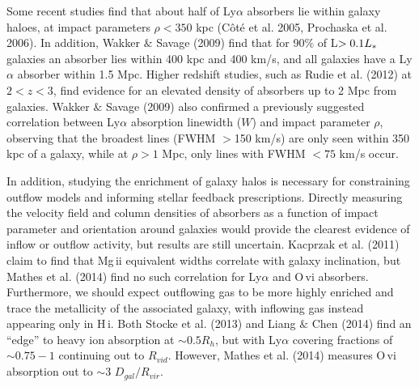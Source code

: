 \documentclass[iop]{emulateapj-rtx4}
\begin{document}


Some recent studies find that about half of Ly$\alpha$ absorbers lie within galaxy haloes, at impact parameters $\rho<350$ kpc (C\^{o}t\'{e} et al. 2005, Prochaska et al. 2006). In addition, Wakker $\&$ Savage (2009) find that for 90$\%$ of L$>0.1L_{\**}$ galaxies an absorber lies within 400 kpc and 400 km/s, and all galaxies have a Ly$\alpha$ absorber within 1.5 Mpc. Higher redshift studies, such as Rudie et al. (2012) at $2<z<3$, find evidence for an elevated density of absorbers up to 2 Mpc from galaxies. Wakker $\&$ Savage (2009) also confirmed a previously suggested correlation between Ly$\alpha$ absorption linewidth ($W$) and impact parameter $\rho$, observing that the broadest lines (FWHM $>$150 km/s) are only seen within 350 kpc of a galaxy, while at $\rho>1$ Mpc, only lines with FWHM $<75$ km/s occur.


In addition, studying the enrichment of galaxy halos is necessary for constraining outflow models and informing stellar feedback prescriptions. Directly measuring the velocity field and column densities of absorbers as a function of impact parameter and orientation around galaxies would provide the clearest evidence of inflow or outflow activity, but results are still uncertain. Kacprzak et al. (2011) claim to find that Mg\,{\sc ii} equivalent widths correlate with galaxy inclination, but Mathes et al. (2014) find no such correlation for Ly$\alpha$ and O\,{\sc vi} absorbers. Furthermore, we should expect outflowing gas to be more highly enriched and trace the metallicity of the associated galaxy, with inflowing gas instead appearing only in H\,{\sc i}. Both Stocke et al. (2013) and Liang $\&$ Chen (2014) find an ``edge'' to heavy ion absorption at $\sim0.5R_h$, but with Ly$\alpha$ covering fractions of $\sim0.75-1$ continuing out to $R_{vid}$. However, Mathes et al. (2014) measures O\,{\sc vi} absorption out to $\sim3$ $D_{gal}/R_{vir}$. 
\end{document}
